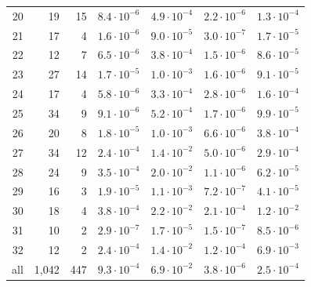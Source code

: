 \begin{tabular}{rrrllll}
20 & 19 & 15 & $8.4\cdot10^{-6}$ & $4.9\cdot10^{-4}$ & $2.2\cdot10^{-6}$ & $1.3\cdot10^{-4}$ \\
21 & 17 & 4 & $1.6\cdot10^{-6}$ & $9.0\cdot10^{-5}$ & $3.0\cdot10^{-7}$ & $1.7\cdot10^{-5}$ \\
22 & 12 & 7 & $6.5\cdot10^{-6}$ & $3.8\cdot10^{-4}$ & $1.5\cdot10^{-6}$ & $8.6\cdot10^{-5}$ \\
23 & 27 & 14 & $1.7\cdot10^{-5}$ & $1.0\cdot10^{-3}$ & $1.6\cdot10^{-6}$ & $9.1\cdot10^{-5}$ \\
24 & 17 & 4 & $5.8\cdot10^{-6}$ & $3.3\cdot10^{-4}$ & $2.8\cdot10^{-6}$ & $1.6\cdot10^{-4}$ \\
25 & 34 & 9 & $9.1\cdot10^{-6}$ & $5.2\cdot10^{-4}$ & $1.7\cdot10^{-6}$ & $9.9\cdot10^{-5}$ \\
26 & 20 & 8 & $1.8\cdot10^{-5}$ & $1.0\cdot10^{-3}$ & $6.6\cdot10^{-6}$ & $3.8\cdot10^{-4}$ \\
27 & 34 & 12 & $2.4\cdot10^{-4}$ & $1.4\cdot10^{-2}$ & $5.0\cdot10^{-6}$ & $2.9\cdot10^{-4}$ \\
28 & 24 & 9 & $3.5\cdot10^{-4}$ & $2.0\cdot10^{-2}$ & $1.1\cdot10^{-6}$ & $6.2\cdot10^{-5}$ \\
29 & 16 & 3 & $1.9\cdot10^{-5}$ & $1.1\cdot10^{-3}$ & $7.2\cdot10^{-7}$ & $4.1\cdot10^{-5}$ \\
30 & 18 & 4 & $3.8\cdot10^{-4}$ & $2.2\cdot10^{-2}$ & $2.1\cdot10^{-4}$ & $1.2\cdot10^{-2}$ \\
31 & 10 & 2 & $2.9\cdot10^{-7}$ & $1.7\cdot10^{-5}$ & $1.5\cdot10^{-7}$ & $8.5\cdot10^{-6}$ \\
32 & 12 & 2 & $2.4\cdot10^{-4}$ & $1.4\cdot10^{-2}$ & $1.2\cdot10^{-4}$ & $6.9\cdot10^{-3}$ \\
\midrule
all & 1{,}042 & 447 & $9.3\cdot10^{-4}$ & $6.9\cdot10^{-2}$ & $3.8\cdot10^{-6}$ & $2.5\cdot10^{-4}$ \\
\bottomrule
\end{tabular}
